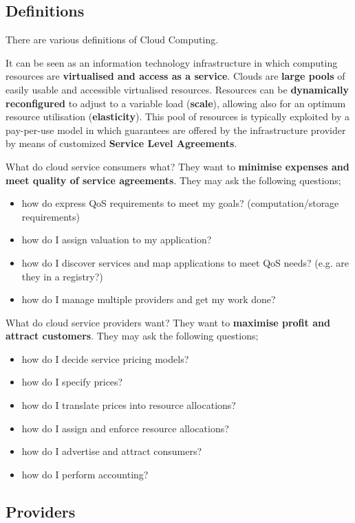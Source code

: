 \documentclass{article}
\begin{document}
\subsection{Definitions}

There are various definitions of Cloud Computing.

It can be seen as an information technology infrastructure in which computing resources are \textbf{virtualised and access as a service}. Clouds are \textbf{large pools} of easily usable and accessible virtualised resources. Resources can be \textbf{dynamically reconfigured} to adjust to a variable load (\textbf{scale}), allowing also for an optimum resource utilisation (\textbf{elasticity}). This pool of resources is typically exploited by a pay-per-use model in which guarantees are offered by the infrastructure provider by means of customized \textbf{Service Level Agreements}.

What do cloud service consumers what? They want to \textbf{minimise expenses and meet quality of service agreements}. They may ask the following questions;
\begin{itemize}
	\item how do express QoS requirements to meet my goals? (computation/storage requirements)
	\item how do I assign valuation to my application?
	\item how do I discover services and map applications to meet QoS needs? (e.g. are they in a registry?)
	\item how do I manage multiple providers and get my work done?
\end{itemize}

What do cloud service providers want? They want to \textbf{maximise profit and attract customers}. They may ask the following questions;
\begin{itemize}
	\item how do I decide service pricing models?
	\item how do I specify prices?
	\item how do I translate prices into resource allocations?
	\item how do I assign and enforce resource allocations?
	\item how do I advertise and attract consumers?
	\item how do I perform accounting?
\end{itemize}

\subsection{Providers}
\end{document}
